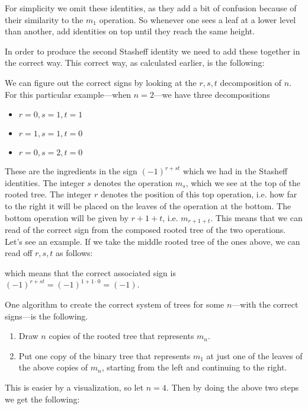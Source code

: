 For simplicity we omit these identities, as they add a bit of confusion because of their similarity to the $m_1$ operation. So whenever one sees a leaf at a lower level than another, add identities on top until they reach the same height.

In order to produce the second Stasheff identity we need to add these together in the correct way. This correct way, as calculated earlier, is the following:


We can figure out the correct signs by looking at the $r, s, t$ decomposition of $n$. For this particular example---when $n=2$---we have three decompositions
\begin{itemize}
    \item $r=0, s=1, t=1$
    \item $r=1, s=1, t=0$
    \item $r=0, s=2, t=0$
\end{itemize}
These are the ingredients in the sign $(-1)^{r+st}$ which we had in the Stasheff identities. The integer $s$ denotes the operation $m_s$, which we see at the top of the rooted tree. The integer $r$ denotes the position of this top operation, i.e. how far to the right it will be placed on the leaves of the operation at the bottom. The bottom operation will be given by $r+1+t$, i.e. $m_{r+1+t}$. This means that we can read of the correct sign from the composed rooted tree of the two operations. Let's see an example. If we take the middle rooted tree of the ones above, we can read off $r, s, t$ as follows: 


which means that the correct associated sign is $(-1)^{r+st}=(-1)^{1+1\cdot 0}=(-1)$. 





One algorithm to create the correct system of trees for some $n$---with the correct signs---is the following. 
\begin{enumerate}
    \item Draw $n$ copies of the rooted tree that represents $m_n$. 
    \item Put one copy of the binary tree that represents $m_1$ at just one of the leaves of the above copies of $m_n$, starting from the left and continuing to the right. 
\end{enumerate}
This is easier by a visualization, so let $n=4$. Then by doing the above two steps we get the following:



